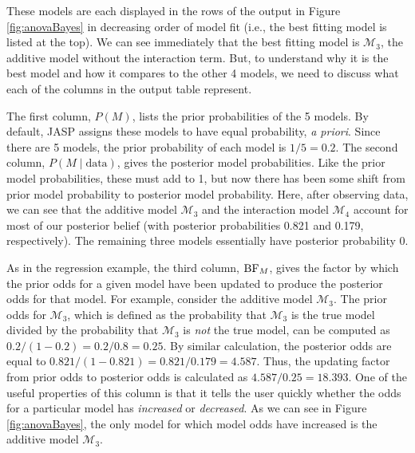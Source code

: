 \documentclass[english,,doc,floatsintext]{apa6}
\begin{document}
These models are each displayed in the rows of the output in Figure \ref{fig:anovaBayes} in decreasing order of model fit (i.e., the best fitting model is listed at the top). We can see immediately that the best fitting model is \(\mathcal{M}_{3}\), the additive model without the interaction term. But, to understand why it is the best model and how it compares to the other 4 models, we need to discuss what each of the columns in the output table represent.

The first column, \(P(M)\), lists the prior probabilities of the 5 models. By default, JASP assigns these models to have equal probability, \emph{a priori}. Since there are 5 models, the prior probability of each model is \(1/5 = 0.2\). The second column, \(P(M\mid \text{data})\), gives the posterior model probabilities. Like the prior model probabilities, these must add to 1, but now there has been some shift from prior model probability to posterior model probability. Here, after observing data, we can see that the additive model \(\mathcal{M}_{3}\) and the interaction model \(\mathcal{M}_{4}\) account for most of our posterior belief (with posterior probabilities 0.821 and 0.179, respectively). The remaining three models essentially have posterior probability 0.

As in the regression example, the third column, \(\textnormal{BF}_{M}\), gives the factor by which the prior odds for a given model have been updated to produce the posterior odds for that model. For example, consider the additive model \(\mathcal{M}_{3}\). The prior odds for \(\mathcal{M}_{3}\), which is defined as the probability that \(\mathcal{M}_{3}\) is the true model divided by the probability that \(\mathcal{M}_{3}\) is \emph{not} the true model, can be computed as \(0.2/(1-0.2) = 0.2/0.8 = 0.25\). By similar calculation, the posterior odds are equal to \(0.821/(1-0.821) = 0.821/0.179 = 4.587\). Thus, the updating factor from prior odds to posterior odds is calculated as \(4.587/0.25 = 18.393\). One of the useful properties of this column is that it tells the user quickly whether the odds for a particular model has \emph{increased} or \emph{decreased}. As we can see in Figure \ref{fig:anovaBayes}, the only model for which model odds have increased is the additive model \(\mathcal{M}_{3}\).
\end{document}
